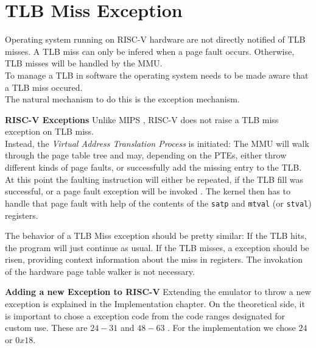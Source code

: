 \section{TLB Miss Exception}
Operating system running on RISC-V hardware are not directly notified of TLB misses.
A TLB miss can only be infered when a page fault occurs. Otherwise, TLB misses will be handled
by the MMU.\\
To manage a TLB in software the operating system needs to be made aware that a TLB miss occured.\\
The natural mechanism to do this is the exception mechanism.

\textbf{RISC-V Exceptions}
Unlike MIPS \cite{heiserAnatomyHighPerformanceMicrokernel}, RISC-V does not raise a TLB miss exception on TLB miss.\\
Instead, the \emph{Virtual Address Translation Process} is initiated: The MMU will walk through
the page table tree and may, depending on the PTEs, either throw different kinds of page faults, or
successfully add the missing entry to the TLB.\\
At this point the faulting instruction will either be repeated, if the TLB fill was successful, or
a page fault exception will be invoked \cite{RISCVInstructionSet}. The kernel then has to handle that page fault with help
of the contents of the \texttt{satp} and \texttt{mtval} (or \texttt{stval}) registers.

The behavior of a TLB Miss exception should be pretty similar: If the TLB hits, the program will
just continue as usual. If the TLB misses, a exception should be risen, providing context
information about the miss in registers. The invokation of the hardware page table walker is
not necessary.


\textbf{Adding a new Exception to RISC-V}
Extending the emulator to throw a new exception is explained in the Implementation chapter.
On the theoretical side, it is important to chose a exception code from the code ranges designated
for custom use. These are $24-31$ and $48-63$ \cite{RISCVInstructionSet}. For the implementation we chose $24$ or $0x18$.




